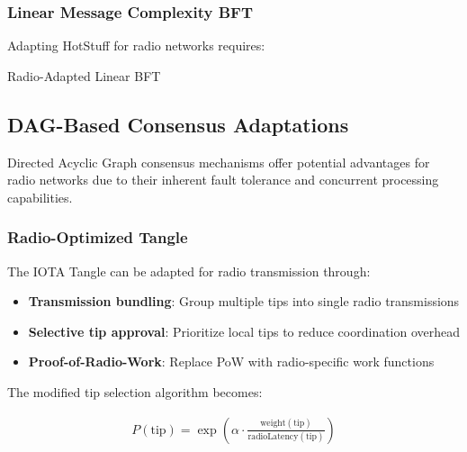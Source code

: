 \documentclass[11pt,a4paper]{article}
\begin{document}
\subsubsection{Linear Message Complexity BFT}

Adapting HotStuff for radio networks requires:

\begin{algorithm}[H]
\SetAlgoLined
{}
\caption{Radio-Adapted Linear BFT}

\;
\end{algorithm}

\subsection{DAG-Based Consensus Adaptations}

Directed Acyclic Graph consensus mechanisms offer potential advantages for radio networks due to their inherent fault tolerance and concurrent processing capabilities.

\subsubsection{Radio-Optimized Tangle}

The IOTA Tangle can be adapted for radio transmission through:

\begin{itemize}
\item \textbf{Transmission bundling}: Group multiple tips into single radio transmissions
\item \textbf{Selective tip approval}: Prioritize local tips to reduce coordination overhead
\item \textbf{Proof-of-Radio-Work}: Replace PoW with radio-specific work functions
\end{itemize}

The modified tip selection algorithm becomes:

\begin{align}
P(\text{tip}) = \exp\left(\alpha \cdot \frac{\text{weight}(\text{tip})}{\text{radioLatency}(\text{tip})}\right)
\end{align}
\end{document}
